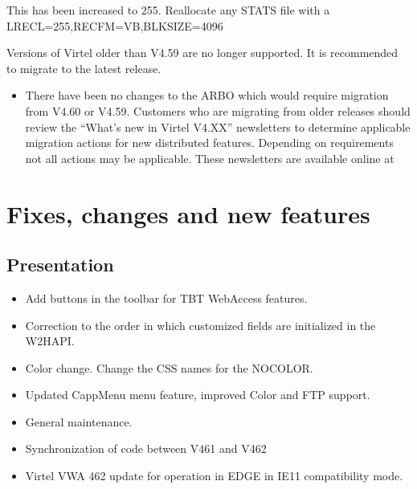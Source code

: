 \documentclass[letterpaper,10pt,english]{sphinxmanual}
\begin{document}
\sphinxAtStartPar
{}

\sphinxAtStartPar
This has been increased to 255. Reallocate any STATS file with a LRECL=255,RECFM=VB,BLKSIZE=4096

\sphinxAtStartPar
{}

\sphinxAtStartPar
Versions of Virtel older than V4.59 are no longer supported. It is recommended to migrate to the latest release.

\sphinxAtStartPar
{}
\begin{itemize}
\item {} 
\sphinxAtStartPar
There have been no changes to the ARBO which would require migration from V4.60 or V4.59. Customers who are migrating from older releases should review the “What’s new in Virtel V4.XX” newsletters to determine applicable migration actions for new distributed features. Depending on requirements not all actions may be applicable. These newsletters are available online at 

\end{itemize}


\chapter{Fixes, changes and new features}
\label{\detokenize{TN202403:fixes-changes-and-new-features}}

\section{Presentation}
\label{\detokenize{TN202403:presentation}}
\sphinxAtStartPar
{}
\begin{itemize}
\item {} 
 Add buttons in the toolbar for TBT WebAccess features.

\item {} 
 Correction to the order in which customized fields are initialized in the W2HAPI.

\item {} 
 Color change. Change the CSS names for the NOCOLOR.

\item {} 
 Updated CappMenu menu feature, improved Color and FTP support.

\item {} 
 General maintenance.

\item {} 
 Synchronization of code between V461 and V462

\item {} 
 Virtel VWA 462 update for operation in EDGE in IE11 compatibility mode.

\end{itemize}
\end{document}
